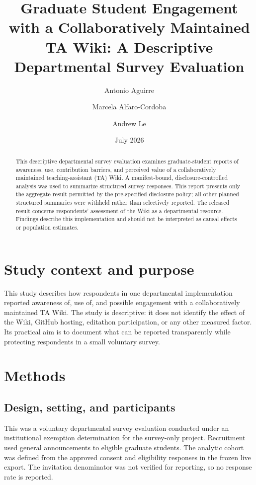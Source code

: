 \documentclass[11pt]{article}
\title{Graduate Student Engagement with a Collaboratively Maintained\\
TA Wiki: A Descriptive Departmental Survey Evaluation}
\author{Antonio Aguirre \and Marcela Alfaro-Cordoba \and Andrew Le}
\date{July 2026}
\begin{document}
\maketitle

\begin{abstract}
This descriptive departmental survey evaluation examines graduate-student reports of
awareness, use, contribution barriers, and perceived value of a collaboratively
maintained teaching-assistant (TA) Wiki. A manifest-bound, disclosure-controlled
analysis was used to summarize structured survey responses. This report presents
only the aggregate result permitted by the pre-specified disclosure policy; all
other planned structured summaries were withheld rather than selectively
reported. The released result concerns respondents' assessment of the Wiki as a
departmental resource. Findings describe this implementation and should not be
interpreted as causal effects or population estimates.
\end{abstract}

\section{Study context and purpose}

This study describes how respondents in one departmental implementation
reported awareness of, use of, and possible engagement with a collaboratively
maintained TA Wiki. The study is descriptive: it does not identify the effect of
the Wiki, GitHub hosting, editathon participation, or any other measured
factor. Its practical aim is to document what can be reported transparently
while protecting respondents in a small voluntary survey.

\section{Methods}

\subsection{Design, setting, and participants}

This was a voluntary departmental survey evaluation conducted under an
institutional exemption determination for the survey-only project. Recruitment
used general announcements to eligible graduate students. The analytic cohort
was defined from the approved consent and eligibility responses in the frozen
live export. The invitation denominator was not verified for reporting, so no
response rate is reported.
\end{document}
